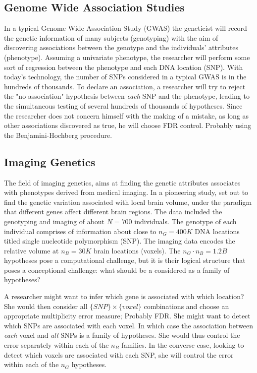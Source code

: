 \documentclass[draft,12pt]{article}
\begin{document}
\subsection{Genome Wide Association Studies}
In a typical Genome Wide Association Study (GWAS) the geneticist will record the genetic information of many subjects (genotyping) with the aim of discovering associations between the genotype and the individuals' attributes (phenotype). Assuming a univariate phenotype, the researcher will perform some sort of regression between the phenotype and each DNA location (SNP). With today’s technology, the number of SNPs considered in a typical GWAS is in the hundreds of thousands. To declare an association, a researcher will try to reject the "no association" hypothesis between \emph{each} SNP and the phenotype, leading to the simultaneous testing of several hundreds of thousands of hypotheses. Since the researcher does not concern himself with the making of a mistake, as long as other associations discovered as true, he will choose FDR control. Probably using the Benjamini-Hochberg procedure.




\subsection{\label{eg:imaging_genetics}Imaging Genetics}
The field of imaging genetics, aims at finding the genetic attributes associates with phenotypes derived from medical imaging. In a pioneering study, \citet{stein_voxelwise_2010} set out to find the genetic variation associated with local brain volume, under the paradigm that different genes affect different brain regions. The data included the genotyping and imaging of about $N=700$ individuals. The genotype of each individual comprises of information about close to $n_G=400K$ DNA locations titled single nucleotide polymorphism (SNP). The imaging data encodes the relative volume at $n_B=30K$ brain locations (voxels). The $n_G \cdot n_B=1.2B$ hypotheses pose a computational challenge, but it is their logical structure that poses a conceptional challenge: what should be a considered as a family of hypotheses?

A researcher might want to infer which gene is associated with which location? She would then consider all $\{SNP\} \times \{voxel\}$ combinations and choose an appropriate multiplicity error measure; Probably FDR. 
She might want to detect which SNPs are associated with each voxel. In which case the association between \emph{each} voxel and \emph{all} SNPs is a family of hypotheses. She would thus control the error separately within each of the $n_B$ families. 
In the converse case, looking to detect which voxels are associated with each SNP, she will control the error within each of the $n_G$ hypotheses.
\end{document}
